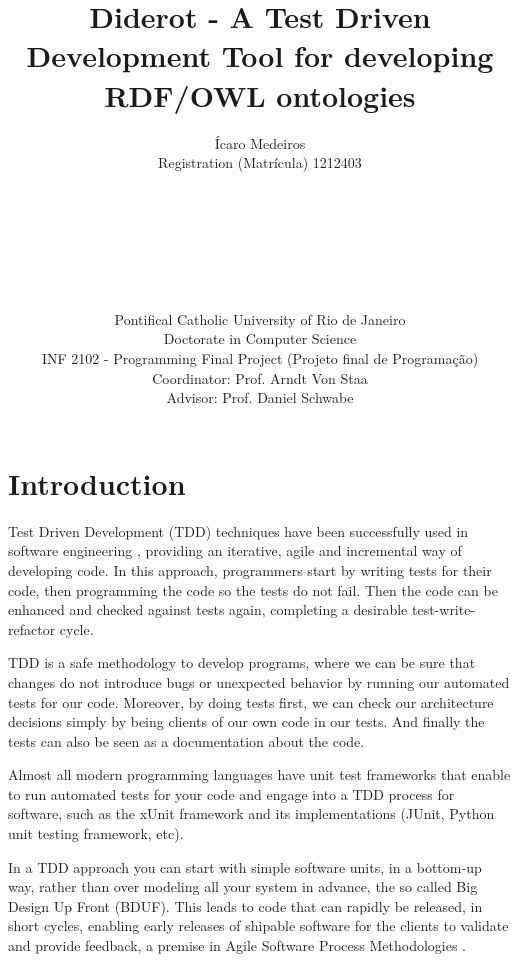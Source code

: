 \documentclass{report}
\begin{document}
\title{Diderot - A Test Driven Development Tool for developing RDF/OWL ontologies}
\author{
Ícaro Medeiros\\
Registration (Matrícula) 1212403
\\ \\ \\ \\ \\ \\ \\ \\
Pontifical Catholic University of Rio de Janeiro \\
Doctorate in Computer Science \\
INF 2102 - Programming Final Project (Projeto final de Programação) \\
Coordinator: Prof. Arndt Von Staa \\
Advisor: Prof. Daniel Schwabe
}

\maketitle
\tableofcontents

\chapter{Introduction}

Test Driven Development (TDD) techniques have been successfully used in software engineering \cite{beck03}, providing an iterative, agile and incremental way of developing code.
In this approach, programmers start by writing tests for their code, then programming the code so the tests do not fail.
Then the code can be enhanced and checked against tests again, completing a desirable test-write-refactor cycle.

TDD is a safe methodology to develop programs, where we can be sure that changes do not introduce bugs or unexpected behavior by running our automated tests for our code.
Moreover, by doing tests first, we can check our architecture decisions simply by being clients of our own code in our tests. And finally the tests can also be seen as a documentation about the code.

Almost all modern programming languages have unit test frameworks that enable to run automated tests for your code and engage into a TDD process for software, such as the xUnit framework \cite{beck03} and its implementations (JUnit, Python unit testing framework, etc).

In a TDD approach you can start with simple software units, in a bottom-up way,
rather than over modeling all your system in advance, the so called Big Design Up Front (BDUF).
This leads to code that can rapidly be released, in short cycles, enabling early releases of
shipable software for the clients to validate and provide feedback, a premise in Agile
Software Process Methodologies \cite{beck01, beck04, martin03}.
\end{document}

